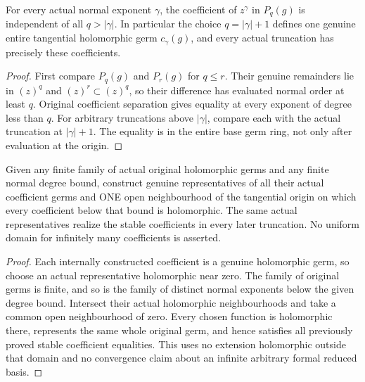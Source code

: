\begin{theorem}
\label{hir:actual-relative-coefficient-germ-stability}
\leanok
For every actual normal exponent $\gamma$, the coefficient of $z^\gamma$
in $P_q(g)$ is independent of all $q>|\gamma|$. In particular the choice
$q=|\gamma|+1$ defines one genuine entire tangential holomorphic germ
$c_\gamma(g)$, and every actual truncation has precisely these coefficients.
\end{theorem}
\begin{proof}
First compare $P_q(g)$ and $P_r(g)$ for $q\le r$. Their genuine remainders
lie in $(z)^q$ and $(z)^r\subset(z)^q$, so their difference has evaluated
normal order at least $q$. Original coefficient separation gives equality
at every exponent of degree less than $q$. For arbitrary truncations above
$|\gamma|$, compare each with the actual truncation at $|\gamma|+1$.
The equality is in the entire base germ ring, not only after evaluation
at the origin.
\end{proof}

\begin{theorem}
\label{hir:actual-relative-coefficient-common-finite-domain}
\leanok
Given any finite family of actual original holomorphic germs and any finite
normal degree bound, construct genuine representatives of all their actual
coefficient germs and ONE open neighbourhood of the tangential origin on
which every coefficient below that bound is holomorphic. The same actual
representatives realize the stable coefficients in every later truncation.
No uniform domain for infinitely many coefficients is asserted.
\end{theorem}
\begin{proof}
Each internally constructed coefficient is a genuine holomorphic germ,
so choose an actual representative holomorphic near zero. The family of
original germs is finite, and so is the family of distinct normal exponents
below the given degree bound. Intersect their actual holomorphic
neighbourhoods and take a common open neighbourhood of zero. Every chosen
function is holomorphic there, represents the same whole original germ,
and hence satisfies all previously proved stable coefficient equalities.
This uses no extension holomorphic outside that domain and no convergence
claim about an infinite arbitrary formal reduced basis.
\end{proof}
